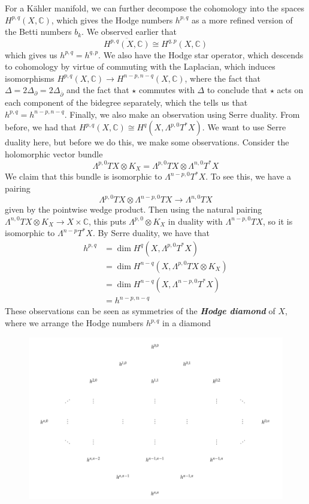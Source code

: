 \documentclass[psamsfonts, 12pt]{amsart}
\theoremstyle{definition}
\theoremstyle{remark}
\newcommand{\ib}[1]{\textbf{\textit{#1}}}
\newcommand{\C}{\mathbb{C}}
\newcommand{\dbar}{\overline{\partial}}
\begin{document}
For a K\"ahler manifold, we can further decompose the cohomology into the spaces
$H^{p,q}(X,\C)$, which gives the Hodge numbers $h^{p,q}$ as a more refined version
of the Betti numbers $b_k$. We observed earlier that
\[
\overline{H^{p,q}(X,\C)} \cong H^{q,p}(X,\C)
\]
which gives us $h^{p,q} = h^{q,p}$. We also have the Hodge star operator, which
descends to cohomology by virtue of commuting with the Laplacian, which induces
isomorphisms $H^{p,q}(X,\C) \to H^{n-p,n-q}(X,\C)$, where the fact that
$\Delta = 2\Delta_\partial = 2\Delta_{\dbar}$ and the fact that $\star$ commutes with
$\Delta$ to conclude that $\star$ acts on each component of the bidegree separately,
which the tells us that $h^{p,q} = h^{n-p,n-q}$. Finally, we also make an observation
using Serre duality. From before, we had that
$H^{p,q}(X,\C) \cong H^q(X, \Lambda^{p,0}T^*X)$. We want to use Serre duality here,
but before we do this, we make some observations. Consider the holomorphic
vector bundle
\[
\Lambda^{p,0}TX \otimes K_X = \Lambda^{p,0}TX \otimes \Lambda^{n,0}T^*X
\]
We claim that this bundle is isomorphic to $\Lambda^{n-p,0}T^*X$. To see this,
we have a pairing
\[
\Lambda^{p,0}TX \otimes \Lambda^{n-p,0}TX \to \Lambda^{n,0}TX
\]
given by the pointwise wedge product. Then using the natural pairing
$\Lambda^{n,0}TX \otimes K_X \to X \times \C$, this puts $\Lambda^{p,0}\otimes K_X$
in duality with $\Lambda^{n-p,0}TX$, so it is isomorphic to $\Lambda^{n-p}T^*X$.
By Serre duality, we have that
\begin{align*}
h^{p,q} &= \dim H^q(X,\Lambda^{p,0}T^*X) \\
&= \dim H^{n-q}(X, \Lambda^{p,0}TX \otimes K_X) \\
&= \dim H^{n-q}(X, \Lambda^{n-p,0}T^*X) \\
&= h^{n-p,n-q}
\end{align*}
These observations can be seen as symmetries of the \ib{Hodge diamond} of $X$, where
we arrange the Hodge numbers $h^{p,q}$ in a diamond
\begin{figure}[H]
\includegraphics[width=\textwidth]{HodgeDiamond}
\end{figure}
\end{document}
